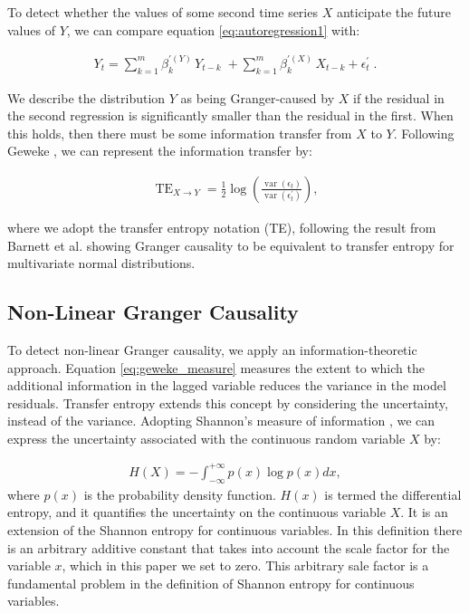 \documentclass[]{rsos}%
\begin{document}
{  To detect whether the values of some second time series $X$ anticipate the future values of $Y$, we can compare equation \ref{eq:autoregression1}  with: 

  \begin{eqnarray}
    \label{eq:autoregression2}
  Y_t = \sum_{k=1}^m \beta_{k}^{\prime(Y)} \, Y_{t-k}  \; + 
        \sum_{k=1}^m \beta_{k}^{\prime(X)} \, X_{t-k} 
  + \epsilon^{\prime}_t \;.
  \end{eqnarray}

We describe the distribution $Y$ as being Granger-caused by $X$ if the residual in the second regression is significantly smaller than the residual in the first. When this holds, then there must be some information transfer from $X$ to $Y$. Following Geweke \cite{geweke1984measures}, we can represent the information transfer by:

  \begin{eqnarray}
    \label{eq:geweke_measure}
    \operatorname{TE}_{X\rightarrow Y} = \frac12\log \left(
      \frac{\operatorname{var}(\epsilon_t)}
          {\operatorname{var}(\epsilon^{\prime}_t)}
  \right) ,
  \end{eqnarray}

    where we adopt the transfer entropy notation (TE), following the result from Barnett et al. \cite{barnett2009granger} showing Granger causality to be equivalent to transfer entropy for multivariate normal distributions.

  \subsection{Non-Linear Granger Causality}

  To detect non-linear Granger causality, we apply an information-theoretic approach. Equation \ref{eq:geweke_measure} measures the extent to which the additional information in the lagged variable reduces the variance in the model residuals. Transfer entropy extends this concept by considering the uncertainty, instead of the variance. Adopting Shannon's measure of information \cite{shannon1948}, we can express the uncertainty associated with the continuous random variable $X$ by:

  \begin{eqnarray}
    \label{eq:entropy}
    H(X) = - \int_{-\infty}^{+\infty}  { p(x) \log{p(x)}  } dx,
  \end{eqnarray}
where $p(x)$ is the probability density function.   
$H(x)$ is termed the differential entropy, and it quantifies the uncertainty on the continuous variable $X$. It is an extension of the Shannon entropy for continuous variables. 
In this definition there is an arbitrary additive constant that takes into account the scale factor for the variable $x$, which in this paper we set to zero.
This arbitrary sale factor is a fundamental problem in the definition of Shannon entropy for continuous variables. 

}
\end{document}
